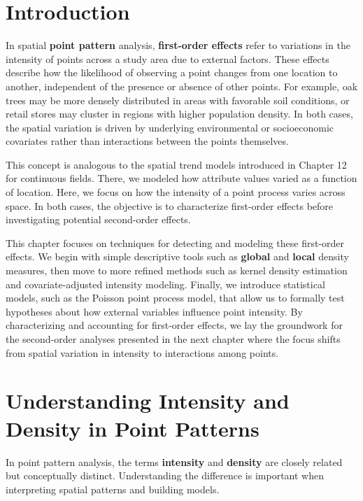 \documentclass[
  letterpaper,
]{book}
\begin{document}
\section{Introduction}\label{introduction-13}

In spatial \textbf{point pattern} analysis, \textbf{first-order effects}
refer to variations in the intensity of points across a study area due
to external factors. These effects describe how the likelihood of
observing a point changes from one location to another, independent of
the presence or absence of other points. For example, oak trees may be
more densely distributed in areas with favorable soil conditions, or
retail stores may cluster in regions with higher population density. In
both cases, the spatial variation is driven by underlying environmental
or socioeconomic covariates rather than interactions between the points
themselves.

This concept is analogous to the spatial trend models introduced in
Chapter 12 for continuous fields. There, we modeled how attribute values
varied as a function of location. Here, we focus on how the intensity of
a point process varies across space. In both cases, the objective is to
characterize first-order effects before investigating potential
second-order effects.

This chapter focuses on techniques for detecting and modeling these
first-order effects. We begin with simple descriptive tools such as
\textbf{global} and \textbf{local} density measures, then move to more
refined methods such as kernel density estimation and covariate-adjusted
intensity modeling. Finally, we introduce statistical models, such as
the Poisson point process model, that allow us to formally test
hypotheses about how external variables influence point intensity. By
characterizing and accounting for first-order effects, we lay the
groundwork for the second-order analyses presented in the next chapter
where the focus shifts from spatial variation in intensity to
interactions among points.

\section{Understanding Intensity and Density in Point
Patterns}\label{understanding-intensity-and-density-in-point-patterns}

In point pattern analysis, the terms \textbf{intensity} and
\textbf{density} are closely related but conceptually distinct.
Understanding the difference is important when interpreting spatial
patterns and building models.
\end{document}
